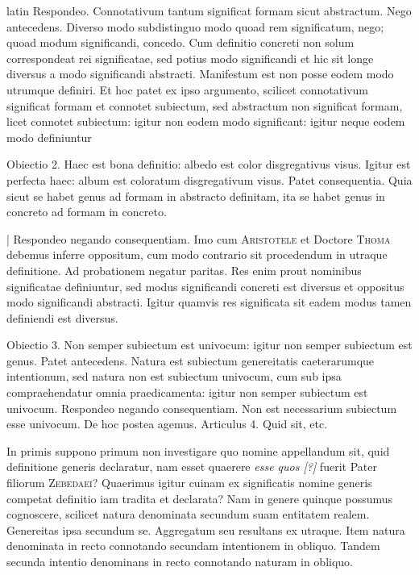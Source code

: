 \begin{otherlanguage*}{latin}
\pstart
  Respondeo. Connotativum tantum significat formam sicut abstractum. Nego antecedens. Diverso modo subdistinguo modo quoad rem significatum, nego; quoad modum significandi, concedo. Cum definitio concreti non solum correspondeat rei significatae, sed potius modo significandi et hic sit longe diversus a modo significandi abstracti. Manifestum est non posse eodem modo utrumque definiri. Et hoc patet ex ipso argumento, scilicet connotativum significat formam et connotet subiectum, sed abstractum non significat formam, licet connotet subiectum: igitur non eodem modo significant: igitur neque eodem modo definiuntur 
\pend

\pstart
  Obiectio 2. Haec est bona definitio: albedo est color disgregativus visus. Igitur est perfecta haec: album est coloratum disgregativum visus. Patet consequentia. Quia sicut se habet genus ad formam in abstracto definitam, ita se habet genus in concreto ad formam in concreto. 
\pend

\pstart
  \textnormal{|} Respondeo negando consequentiam. Imo cum \textsc{Aristotele} et Doctore \textsc{Thoma} debemus inferre oppositum, cum modo contrario sit procedendum in utraque definitione. Ad probationem negatur paritas. Res enim prout nominibus significatae definiuntur, sed modus significandi concreti est diversus et oppositus modo significandi abstracti. Igitur quamvis res significata sit eadem modus tamen definiendi est diversus. 
\pend

\pstart
  Obiectio 3. Non semper subiectum est univocum: igitur non semper subiectum est genus. Patet antecedens. Natura est subiectum genereitatis caeterarumque intentionum, sed natura non est subiectum univocum, cum sub ipsa compraehendatur omnia praedicamenta: igitur non semper subiectum est univocum. Respondeo negando consequentiam. Non est necessarium subiectum esse univocum. De hoc postea agemus. Articulus 4. Quid sit, etc. 
\pend

        \pstart
        \pend
      
\pstart
  In primis suppono primum non investigare quo nomine appellandum sit, quid definitione generis declaratur, nam esset quaerere \emph{esse quos [?]} fuerit Pater filiorum \textsc{Zebedaei}? Quaerimus igitur cuinam ex significatis nomine generis competat definitio iam tradita et declarata? Nam in genere quinque possumus cognoscere, scilicet natura denominata secundum suam entitatem realem. Genereitas ipsa secundum se. Aggregatum seu resultans ex utraque. Item natura denominata in recto connotando secundam intentionem in obliquo. Tandem secunda intentio denominans in recto connotando naturam in obliquo. 
\pend


\end{otherlanguage*}
